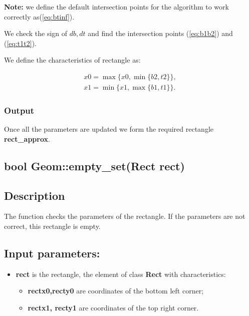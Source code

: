 \documentclass{report}
\begin{document}
\begin{itemize}
\begin{itemize}
		{\bfseries Note:} we define the default intersection points for the algorithm to work correctly as(\ref{eq:btinf}).
		
		We check the sign of $db, dt$ and find the intersection points  (\ref{eq:b1b2}) and (\ref{eq:t1t2}).
		
		We define the characteristics of rectangle as:
		
		\begin{equation}
			\begin{gathered}
				x0 = \max\{x0, \min\{b2, t2\}\},\\
				x1 = \min\{x1, \max\{b1, t1\}\}.
			\end{gathered}
		\end{equation}
		
	\end{itemize}	
\end{itemize}

\subsubsection*{Output}

Once all the parameters are updated we form the required rectangle {\bfseries rect\_approx}.

\newpage
\begin{center} 
	\section*{\bfseries bool Geom::empty\_set(Rect rect)}
\end{center} 

\subsection*{Description}

The function checks the parameters of the rectangle. If the parameters are not correct, this rectangle is empty. 

\subsection*{Input parameters:}

\begin{itemize}
	\item {\bfseries	rect} is the rectangle, the element of class {\bfseries Rect} with characteristics:
	
	\begin{itemize}
		\item {\bfseries rectx0,recty0} are coordinates of the bottom left corner;
		\item {\bfseries rectx1, recty1} are coordinates of the top right corner.
	\end{itemize}
\end{itemize}
\end{document}
